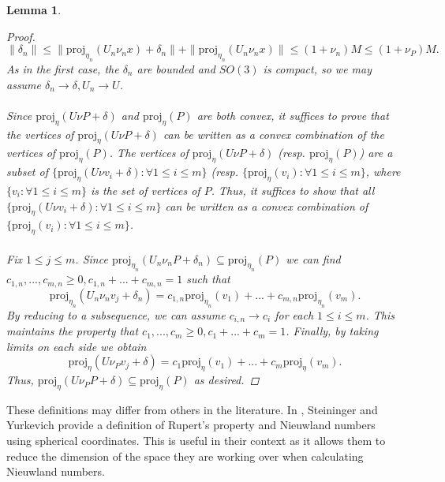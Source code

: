 \documentclass[a4paper]{amsart}
\newtheorem{lem}[thm]{Lemma}
\theoremstyle{remark}
\begin{document}
\begin{lem}
\begin{proof}
$$\|\delta_n\|\leq \|\textrm{proj}_{\eta_n}(U_n\nu_nx)+\delta_n\| +\|\textrm{proj}_{\eta_n}(U_n\nu_nx)\|\leq (1+\nu_n)M\leq (1+\nu_P)M.$$ As in the first case, the $\delta_n$ are bounded and $SO(3)$ is compact, so we may assume $\delta_n\to\delta, U_n\to U$.
\\\\
Since $\textrm{proj}_{\eta}(U\nu P+\delta)$ and $\textrm{proj}_{\eta}(P)$ are both convex, it suffices to prove that the vertices of $\textrm{proj}_{\eta}(U\nu P+\delta)$ can be written as a convex combination of the vertices of $\textrm{proj}_{\eta}(P)$. The vertices of $\textrm{proj}_{\eta}(U\nu P+\delta)$ (resp. $\textrm{proj}_{\eta}(P)$) are a subset of $\{\textrm{proj}_{\eta}(U\nu v_i+\delta): \forall 1\leq i\leq m\}$ (resp. $\{\textrm{proj}_{\eta}(v_i): \forall 1\leq i\leq m\}$, where $\{v_i:\forall 1\leq i \leq m\}$ is the set of vertices of $P$. Thus, it suffices to show that all $\{\textrm{proj}_{\eta}(U\nu v_i+\delta): \forall 1\leq i\leq m\}$ can be written as a convex combination of $\{\textrm{proj}_{\eta}(v_i): \forall 1\leq i\leq m\}$.
\\\\
Fix $1\leq j\leq m$. Since $\textrm{proj}_{\eta_n}(U_n\nu_nP+\delta_n)\subseteq \textrm{proj}_{\eta_n}(P)$ we can find $c_{1,n},...,c_{m,n}\geq0, c_{1,n}+...+c_{m,n}=1$ such that $$\textrm{proj}_{\eta_n}(U_n\nu_nv_j+\delta_n)=c_{1,n}\textrm{proj}_{\eta_n}(v_1)+...+c_{m,n}\textrm{proj}_{\eta_n}(v_m).$$ By reducing to a subsequence, we can assume $c_{i,n}\to c_i$ for each $1\leq i \leq m$. This maintains the property that $c_1,...,c_m\geq 0, c_1+...+c_m=1$. Finally, by taking limits on each side we obtain $$\textrm{proj}_{\eta}(U\nu_Pv_j+\delta)=c_1\textrm{proj}_{\eta}(v_1)+...+c_m\textrm{proj}_{\eta}(v_m).$$ Thus, $\textrm{proj}_{\eta}(U\nu_PP+\delta)\subseteq \textrm{proj}_\eta(P)$ as desired.
\end{proof}
\end{lem}
\noindent
These definitions may differ from others in the literature. In \cite{StYu23}, Steininger and Yurkevich provide a definition of Rupert's property and Nieuwland numbers using spherical coordinates. This is useful in their context as it allows them to reduce the dimension of the space they are working over when calculating Nieuwland numbers.
\end{document}
